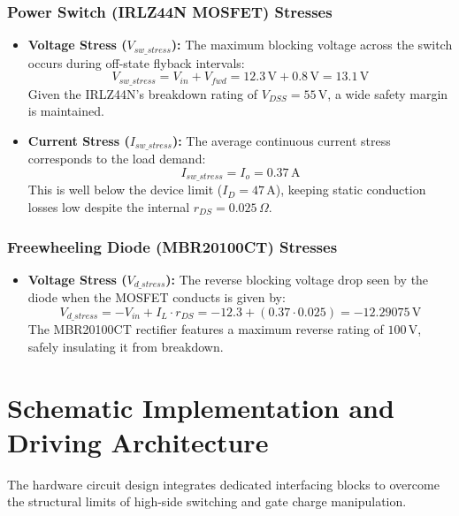 \documentclass[12pt,a4paper]{article}
\begin{document}
\subsubsection{Power Switch (IRLZ44N MOSFET) Stresses}
\begin{itemize}
    \item \textbf{Voltage Stress ($V_{sw\_stress}$):} The maximum blocking voltage across the switch occurs during off-state flyback intervals:
    \begin{equation}
    V_{sw\_stress} = V_{in} + V_{fwd} = 12.3\,\text{V} + 0.8\,\text{V} = 13.1\,\text{V}
    \end{equation}
    Given the IRLZ44N's breakdown rating of $V_{DSS} = 55\,\text{V}$, a wide safety margin is maintained.
    \item \textbf{Current Stress ($I_{sw\_stress}$):} The average continuous current stress corresponds to the load demand:
    \begin{equation}
    I_{sw\_stress} = I_o = 0.37\,\text{A}
    \end{equation}
    This is well below the device limit ($I_D = 47\,\text{A}$), keeping static conduction losses low despite the internal $r_{DS} = 0.025\,\Omega$.
\end{itemize}

\subsubsection{Freewheeling Diode (MBR20100CT) Stresses}
\begin{itemize}
    \item \textbf{Voltage Stress ($V_{d\_stress}$):} The reverse blocking voltage drop seen by the diode when the MOSFET conducts is given by:
    \begin{equation}
    V_{d\_stress} = -V_{in} + I_L \cdot r_{DS} = -12.3 + (0.37 \cdot 0.025) = -12.29075\,\text{V}
    \end{equation}
    The MBR20100CT rectifier features a maximum reverse rating of $100\,\text{V}$, safely insulating it from breakdown.
\end{itemize}

\section{Schematic Implementation and Driving Architecture}
The hardware circuit design integrates dedicated interfacing blocks to overcome the structural limits of high-side switching and gate charge manipulation.
\end{document}
